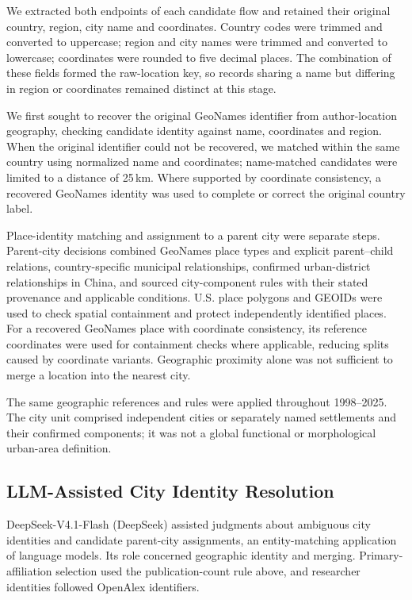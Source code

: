 We extracted both endpoints of each candidate flow and retained their original country, region, city name and coordinates. Country codes were trimmed and converted to uppercase; region and city names were trimmed and converted to lowercase; coordinates were rounded to five decimal places. The combination of these fields formed the raw-location key, so records sharing a name but differing in region or coordinates remained distinct at this stage.

We first sought to recover the original GeoNames identifier from author-location geography, checking candidate identity against name, coordinates and region. When the original identifier could not be recovered, we matched within the same country using normalized name and coordinates; name-matched candidates were limited to a distance of 25\,km. Where supported by coordinate consistency, a recovered GeoNames identity was used to complete or correct the original country label.

Place-identity matching and assignment to a parent city were separate steps. Parent-city decisions combined GeoNames place types and explicit parent--child relations, country-specific municipal relationships, confirmed urban-district relationships in China, and sourced city-component rules with their stated provenance and applicable conditions. U.S. place polygons and GEOIDs were used to check spatial containment and protect independently identified places. For a recovered GeoNames place with coordinate consistency, its reference coordinates were used for containment checks where applicable, reducing splits caused by coordinate variants. Geographic proximity alone was not sufficient to merge a location into the nearest city.

The same geographic references and rules were applied throughout 1998--2025. The city unit comprised independent cities or separately named settlements and their confirmed components; it was not a global functional or morphological urban-area definition.

\subsection{LLM-Assisted City Identity Resolution}

DeepSeek-V4.1-Flash (DeepSeek) assisted judgments about ambiguous city identities and candidate parent-city assignments, an entity-matching application of language models\cite{narayan2022,peeters2025}. Its role concerned geographic identity and merging. Primary-affiliation selection used the publication-count rule above, and researcher identities followed OpenAlex identifiers.

